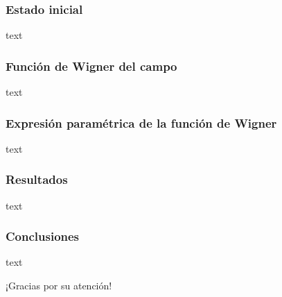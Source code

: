 \documentclass[xcolor=dvipsnames,slidestop,compress,mathserif, 11pt]{beamer}
\begin{document}
\begin{frame}[c]
	\frametitle{Estado inicial}
	text
\end{frame}

\begin{frame}[c]
	\frametitle{Función de Wigner del campo}
	text
\end{frame}

\begin{frame}[c]
	\frametitle{Expresión paramétrica de la función de Wigner}
	text
\end{frame}

\begin{frame}[c]
	\frametitle{Resultados}
	text
\end{frame}

\begin{frame}[c]
	\frametitle{Conclusiones}
	text
\end{frame}

\begin{frame}[c]
	\centering ¡Gracias por su atención!
\end{frame}
\end{document}
